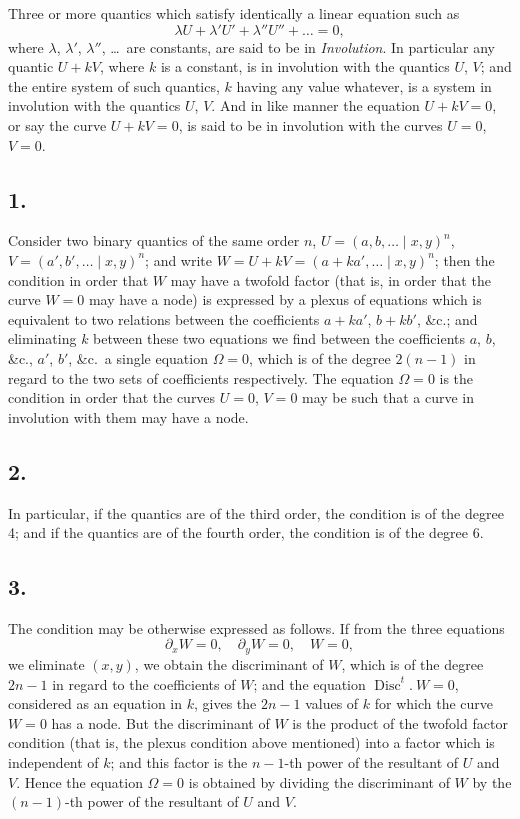 \documentclass[11pt,a4paper]{article}
\theoremstyle{definition}
\DeclareMathOperator{\Disc}{Disc}
\begin{document}
\vspace{0.5em}

Three or more quantics which satisfy identically a linear equation such as
\[
\lambda U + \lambda' U' + \lambda'' U'' + \ldots = 0,
\]
where $\lambda$, $\lambda'$, $\lambda''$, \dots\ are constants, are said to be in \textit{Involution}. In particular any
quantic $U + kV$, where $k$ is a constant, is in involution with the quantics $U$, $V$; and
the entire system of such quantics, $k$ having any value whatever, is a system in
involution with the quantics $U$, $V$. And in like manner the equation $U + kV = 0$, or
say the curve $U + kV = 0$, is said to be in involution with the curves $U = 0$, $V = 0$.

\subsection*{1.}

Consider two binary quantics of the same order $n$, $U = (a, b, \ldots \mid x, y)^{n}$,
$V = (a', b', \ldots \mid x, y)^{n}$; and write $W = U + kV = (a + ka', \ldots \mid x, y)^{n}$; then the condition
in order that $W$ may have a twofold factor (that is, in order that the curve $W = 0$ may
have a node) is expressed by a plexus of equations which is equivalent to two relations
between the coefficients $a + ka'$, $b + kb'$, \&c.; and eliminating $k$ between these two
equations we find between the coefficients $a$, $b$, \&c., $a'$, $b'$, \&c.\ a single equation
$\Omega = 0$, which is of the degree $2(n - 1)$ in regard to the two sets of coefficients respectively.
The equation $\Omega = 0$ is the condition in order that the curves $U = 0$, $V = 0$ may be such
that a curve in involution with them may have a node.

\subsection*{2.}

In particular, if the quantics are of the third order, the condition is of the degree 4;
and if the quantics are of the fourth order, the condition is of the degree 6.

\subsection*{3.}

The condition may be otherwise expressed as follows. If from the three equations
\[
\partial_{x}W = 0,\quad \partial_{y}W = 0,\quad W = 0,
\]
we eliminate $(x, y)$, we obtain the discriminant of $W$, which is of the degree $2n - 1$ in
regard to the coefficients of $W$; and the equation $\Disc^{t}.\ W = 0$, considered as an equation
in $k$, gives the $2n - 1$ values of $k$ for which the curve $W = 0$ has a node. But the
discriminant of $W$ is the product of the twofold factor condition (that is, the plexus
condition above mentioned) into a factor which is independent of $k$; and this factor is
the $n - 1$-th power of the resultant of $U$ and $V$. Hence the equation $\Omega = 0$ is obtained
by dividing the discriminant of $W$ by the $(n - 1)$-th power of the resultant of $U$ and $V$.
\end{document}
